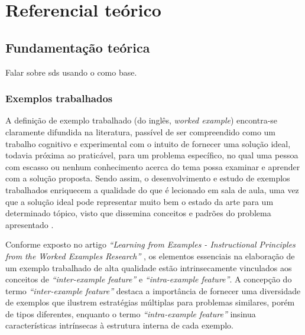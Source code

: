 \chapter{Referencial teórico}
\label{cap:referencialTeorico}


\section{Fundamentação teórica}
\label{section:background}
Falar sobre \gls{sds} usando o \cite{DistributedSystemsCoulouris} como base.


\subsection{Exemplos trabalhados}

A definição de exemplo trabalhado (do inglês, \textit{worked example}) encontra-se claramente difundida na literatura, passível de ser compreendido como um trabalho cognitivo e experimental com o intuito de fornecer uma solução ideal, todavia próxima ao praticável, para um problema específico, no qual uma pessoa com escasso ou nenhum conhecimento acerca do tema possa examinar e aprender com a solução proposta. Sendo assim, o desenvolvimento e estudo de exemplos trabalhados enriquecem a qualidade do que é lecionado em sala de aula, uma vez que a solução ideal pode representar muito bem o estado da arte para um determinado tópico, visto que dissemina conceitos e padrões do problema apresentado \cite{Robert.Atkinson-etal:2000}.

Conforme exposto no artigo \textit{``Learning from Examples - Instructional Principles from the Worked Examples Research''} \cite{Robert.Atkinson-etal:2000}, os elementos essenciais na elaboração de um exemplo trabalhado de alta qualidade estão intrinsecamente vinculados aos conceitos de \textit{``inter-example feature''} e \textit{``intra-example feature''}. A concepção do termo \textit{``inter-example feature''} destaca a importância de fornecer uma diversidade de exemplos que ilustrem estratégias múltiplas para problemas similares, porém de tipos diferentes, enquanto o termo \textit{``intra-example feature''} insinua características intrínsecas à estrutura interna de cada exemplo. 

